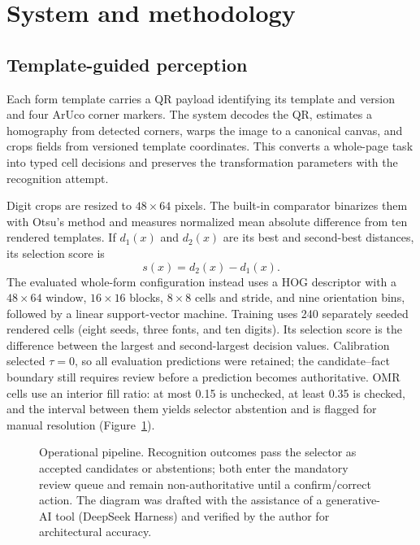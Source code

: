 \section{System and methodology}
\label{sec:method}

\subsection{Template-guided perception}
Each form template carries a QR payload identifying its template and version and four ArUco corner markers. The system decodes the QR, estimates a homography from detected corners, warps the image to a canonical canvas, and crops fields from versioned template coordinates. This converts a whole-page task into typed cell decisions and preserves the transformation parameters with the recognition attempt.

Digit crops are resized to $48\times64$ pixels. The built-in comparator binarizes them with Otsu's method and measures normalized mean absolute difference from ten rendered templates. If $d_1(x)$ and $d_2(x)$ are its best and second-best distances, its selection score is
\begin{equation}
  s(x)=d_2(x)-d_1(x).
\end{equation}
The evaluated whole-form configuration instead uses a HOG descriptor with a $48\times64$ window, $16\times16$ blocks, $8\times8$ cells and stride, and nine orientation bins, followed by a linear support-vector machine. Training uses 240 separately seeded rendered cells (eight seeds, three fonts, and ten digits). Its selection score is the difference between the largest and second-largest decision values. Calibration selected $\tau=0$, so all evaluation predictions were retained; the candidate--fact boundary still requires review before a prediction becomes authoritative. OMR cells use an interior fill ratio: at most 0.15 is unchecked, at least 0.35 is checked, and the interval between them yields selector abstention and is flagged for manual resolution (Figure~\ref{fig:pipeline}).

\begin{figure}[t]
  \centering
  \resizebox{0.96\textwidth}{!}{}
  \caption{Operational pipeline. Recognition outcomes pass the selector as accepted candidates or abstentions; both enter the mandatory review queue and remain non-authoritative until a confirm/correct action. The diagram was drafted with the assistance of a generative-AI tool (DeepSeek Harness) and verified by the author for architectural accuracy.}
  \label{fig:pipeline}
\end{figure}

